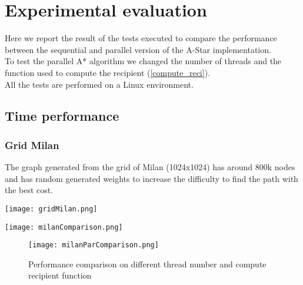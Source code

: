 \section{Experimental evaluation}
\label{Sec:experimental-eval}

Here we report the result of the tests executed to compare the performance between the sequential and parallel version of the A-Star implementation.\\
To test the parallel A* algorithm we changed the number of threads and the function used to compute the recipient (\ref{compute_reci}). \\
All the tests are performed on a Linux environment.

\subsection{Time performance}


\subsubsection{Grid Milan}
The graph generated from the grid of Milan (1024x1024) has around 800k nodes and has random generated weights to increase the difficulty to find the path with the best cost.

\begin{center}
    
    \begin{minipage}[b]{0.3\textwidth}

            \texttt{[image: gridMilan.png]}
            \label{Milan-grid}
        
    \end{minipage}%
    \begin{minipage}[b]{0.6\textwidth}
        
            \texttt{[image: milanComparison.png]}
            \label{Milan-comp}
    \end{minipage}
    
\end{center}


\begin{figure}
    \centering
    \texttt{[image: milanParComparison.png]}
    \caption{Performance comparison on different thread number and compute recipient function}
    \label{Milan-par-comp}
\end{figure}


